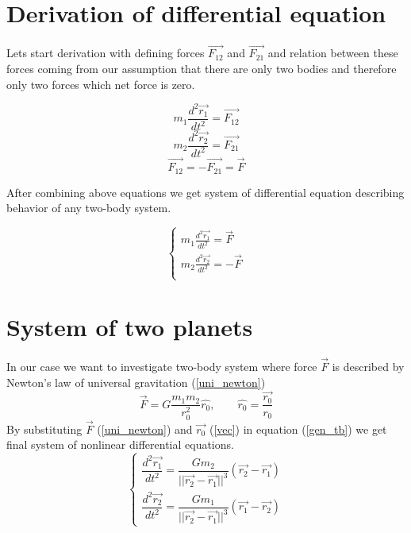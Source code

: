\documentclass[english,12pt,a4paper]{report}
\begin{document}
	\section{Derivation of differential equation}
	
	Lets start derivation with defining forces $\vec{F_{12}}$ and $\vec{F_{21}}$ and relation between these forces coming from our assumption that there are only two bodies and therefore only two forces which net force is zero.
		
	\begin{equation}\label{ef1}
		m_1 \frac{d^2\vec{r_1}}{dt^2} = \vec{F_{12}}
	\end{equation}
	\begin{equation}\label{ef2}
		m_2 \frac{d^2\vec{r_2}}{dt^2} = \vec{F_{21}}
	\end{equation}
	\begin{equation}\label{ef3}
		\vec{F_{12}} = - \vec{F_{21}} = \vec{F}
	\end{equation}
	
	After combining above equations we get system of differential equation describing behavior of any two-body system.
	
	\begin{equation}\label{gen_tb}
		\begin{cases}
			m_1 \frac{d^2\vec{r_1}}{dt^2} = \vec{F} \\
			m_2 \frac{d^2\vec{r_2}}{dt^2} = - \vec{F} \\
		\end{cases}
	\end{equation}
	
	
	\section{System of two planets}
	In our case we want to investigate two-body system where force $\vec{F}$ is described by Newton's law of universal gravitation (\ref{uni_newton})
	\begin{equation}\label{uni_newton}
		\vec{F} = G \frac{m_1 m_2}{r_0^2}\hat{r_0}, \qquad \hat{r_0} = \frac{\vec{r_0}}{r_0}
	\end{equation}
	By substituting $\vec{F}$ (\ref{uni_newton}) and $\vec{r_0}$ (\ref{vec}) in equation (\ref{gen_tb}) we get final system of nonlinear differential equations.
	\begin{equation}
		\begin{cases}
			\dfrac{d^2\vec{r_1}}{dt^2} =  \dfrac{G m_2}{||\vec{r_2} - \vec{r_1}||^3} (\vec{r_2} - \vec{r_1})\\
			\dfrac{d^2\vec{r_2}}{dt^2} =  \dfrac{G m_1}{||\vec{r_2} - \vec{r_1}||^3} (\vec{r_1} - \vec{r_2})
		\end{cases}
	\end{equation}	
	
\end{document}

